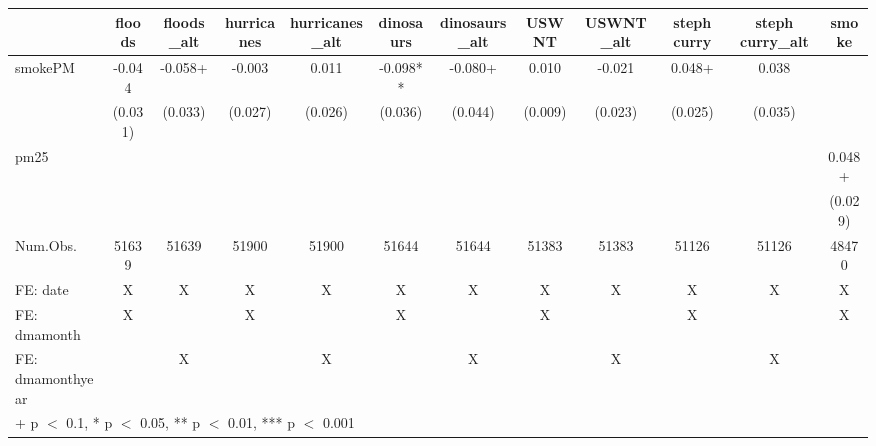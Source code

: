 \begin{table}
\centering
\begin{tabular}[t]{lccccccccccc}
\toprule
  & floods & floods\_alt & hurricanes & hurricanes\_alt & dinosaurs & dinosaurs\_alt & USWNT & USWNT\_alt & steph curry & steph curry\_alt & smoke\\
\midrule
smokePM & -0.044 & -0.058+ & -0.003 & 0.011 & -0.098** & -0.080+ & 0.010 & -0.021 & 0.048+ & 0.038 & \\
 & (0.031) & (0.033) & (0.027) & (0.026) & (0.036) & (0.044) & (0.009) & (0.023) & (0.025) & (0.035) & \\
pm25 &  &  &  &  &  &  &  &  &  &  & 0.048+\\
 &  &  &  &  &  &  &  &  &  &  & (0.029)\\
\midrule
Num.Obs. & 51639 & 51639 & 51900 & 51900 & 51644 & 51644 & 51383 & 51383 & 51126 & 51126 & 48470\\
FE: date & X & X & X & X & X & X & X & X & X & X & X\\
FE: dmamonth & X &  & X &  & X &  & X &  & X &  & X\\
FE: dmamonthyear &  & X &  & X &  & X &  & X &  & X & \\
\bottomrule
\multicolumn{12}{l}{\rule{0pt}{1em}+ p $<$ 0.1, * p $<$ 0.05, ** p $<$ 0.01, *** p $<$ 0.001}\\
\end{tabular}
\end{table}
